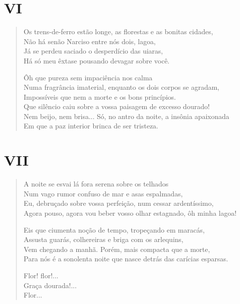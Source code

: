 \medskip
\section{VI}

\begin{verse}
Os trens-de-ferro estão longe, as florestas e as bonitas cidades,\\
Não há senão Narciso entre nós dois, lagoa,\\
Já se perdeu saciado o desperdício das uiaras,\\
Há só meu êxtase pousando devagar sobre você.

Ôh que pureza sem impaciência nos calma\\
Numa fragrância imaterial, enquanto os dois corpos se agradam,\\
Impossíveis que nem a morte e os bons princípios.\\
Que silêncio caiu sobre a vossa paisagem de excesso dourado!\\
Nem beijo, nem brisa... Só, no antro da noite, a insônia apaixonada\\
Em que a paz interior brinca de ser tristeza.
\end{verse}

\medskip
\section{VII}

\begin{verse}
A noite se esvai lá fora serena sobre os telhados\\
Num vago rumor confuso de mar e asas espalmadas,\\
Eu, debruçado sobre vossa perfeição, num cessar ardentíssimo,\\
Agora pouso, agora vou beber vosso olhar estagnado, ôh minha lagoa!

Eis que ciumenta noção de tempo, tropeçando em maracás,\\
Assusta guarás, colhereiras e briga com os arlequins,\\
Vem chegando a manhã. Porém, mais compacta que a morte,\\
Para nós é a sonolenta noite que nasce detrás das carícias esparsas.

Flor! flor!...\\
\quad\quad\quad\quad{}Graça dourada!...\\
\quad\quad\quad\quad\quad\quad\quad\quad\quad\quad{}Flor...
\end{verse}

